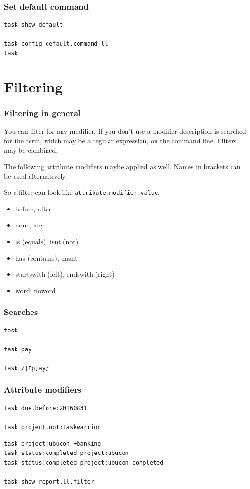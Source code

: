 \documentclass[t]{beamer}
\begin{document}
\begin{frame}[fragile]\frametitle{Set default command}
    \vfill
    \begin{lstlisting}
task show default

task config default.command ll
task\end{lstlisting}
\end{frame}

\section{Filtering}

\begin{frame}[fragile]\frametitle{Filtering in general}
    You can filter for any modifier. If you don't use a modifier description is searched for the term, which may be a regular expression, on the command line. Filters may be combined.

    The following attribute modifiers maybe applied as well. Names in brackets can be used alternatively.

    So a filter can look like \verb=attribute.modifier:value=.

    \begin{itemize}
        \item before, after
        \item none, any
        \item is (equals), isnt (not)
        \item has (contains), hasnt
        \item startswith (left), endswith (right)
        \item word, noword
    \end{itemize}
\end{frame}

\begin{frame}[fragile]\frametitle{Searches}
    \vfill
    \begin{lstlisting}
task

task pay

task /[Pp]ay/\end{lstlisting}
\end{frame}

\begin{frame}[fragile]\frametitle{Attribute modifiers}
    \vfill
    \begin{lstlisting}
task due.before:20160831

task project.not:taskwarrior\end{lstlisting} \pause

    \begin{lstlisting}
task project:ubucon +banking
task status:completed project:ubucon
task status:completed project:ubucon completed

task show report.ll.filter\end{lstlisting}
\end{frame}
\end{document}
